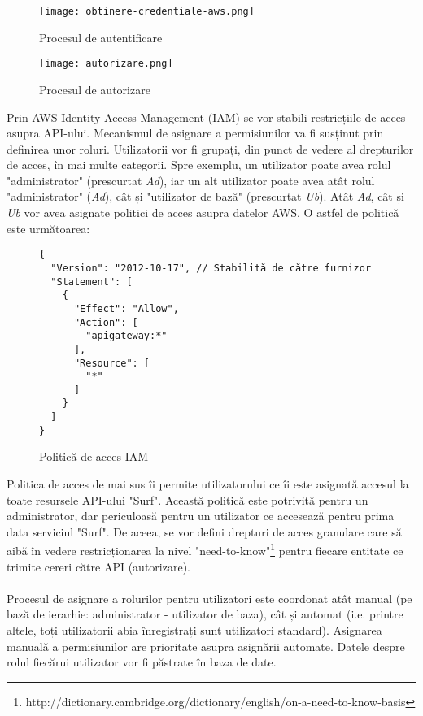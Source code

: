 \begin{figure}[ht]
\begin{center}
	\texttt{[image: obtinere-credentiale-aws.png]}
	\caption{Procesul de autentificare \cite{diagram-icons-sources}}\par\medskip
	\vspace{10mm}
	\texttt{[image: autorizare.png]}
	\caption{Procesul de autorizare \cite{diagram-icons-sources}}\par\medskip

\end{center}
\end{figure}

\noindent
Prin AWS Identity Access Management (IAM) se vor stabili restricțiile de acces asupra API-ului. Mecanismul de asignare a permisiunilor va fi susținut prin definirea unor roluri. Utilizatorii vor fi grupați, din punct de vedere al drepturilor de acces, în mai multe categorii. Spre exemplu, un utilizator poate avea rolul "administrator" (prescurtat \emph{Ad}), iar un alt utilizator poate avea atât rolul "administrator" (\emph{Ad}), cât și "utilizator de bază" (prescurtat \emph{Ub}). Atât \emph{Ad}, cât și \emph{Ub} vor avea asignate politici de acces asupra datelor AWS. O astfel de politică este următoarea:

\begin{figure}[ht]
\begin{verbatim}
{
  "Version": "2012-10-17", // Stabilită de către furnizor
  "Statement": [
    {
      "Effect": "Allow",
      "Action": [
        "apigateway:*"
      ],
      "Resource": [
        "*"
      ]
    }
  ]
}
\end{verbatim}
\begin{center}
	\caption{Politică de acces IAM}\par\medskip
\end{center}
\end{figure}

\noindent
Politica de acces de mai sus îi permite utilizatorului ce îi este asignată accesul la toate resursele API-ului "Surf". Această politică este potrivită pentru un administrator, dar periculoasă pentru un utilizator ce accesează pentru prima data serviciul "Surf". De aceea, se vor defini drepturi de acces granulare care să aibă în vedere restricționarea la nivel "need-to-know"\footnote{http://dictionary.cambridge.org/dictionary/english/on-a-need-to-know-basis} pentru fiecare entitate ce trimite cereri către API (autorizare).
\\
\\
Procesul de asignare a rolurilor pentru utilizatori este coordonat atât manual (pe bază de ierarhie: administrator - utilizator de baza), cât și automat (i.e. printre altele, toți utilizatorii abia înregistrați sunt utilizatori standard). Asignarea manuală a permisiunilor are prioritate asupra asignării automate. Datele despre rolul fiecărui utilizator vor fi păstrate în baza de date.
\\

